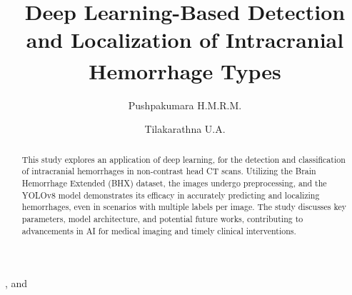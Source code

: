 \documentclass[Print]{../Style/isecure-v24}
\begin{document}
\begin{frontmatter}


\def\NoDingTitle{Deep Learning-Based Detection and Localization of Intracranial Hemorrhage Types}
\title{\NoDingTitle\textsuperscript{ }}


\author[a1,CorAuth]{Pushpakumara H.M.R.M.}, and%
\author[a2]{Tilakarathna U.A.}


\address[a1]{Dep. of Electronic and Telecom. Engineering, University of Moratuwa, Sri Lanka.}
\address[a2]{Dep. of Electronic and Telecom. Engineering, University of Moratuwa, Sri Lanka.}




\begin{abstract}
This study explores an application of deep learning, for the detection and classification of intracranial hemorrhages in non-contrast head CT scans. Utilizing the Brain Hemorrhage Extended (BHX) dataset, the images undergo preprocessing, and the YOLOv8 model demonstrates its efficacy in accurately predicting and localizing hemorrhages, even in scenarios with multiple labels per image. The study discusses key parameters, model architecture, and potential future works, contributing to advancements in AI for medical imaging and timely clinical interventions.


\end{abstract}
\end{frontmatter}
\end{document}
